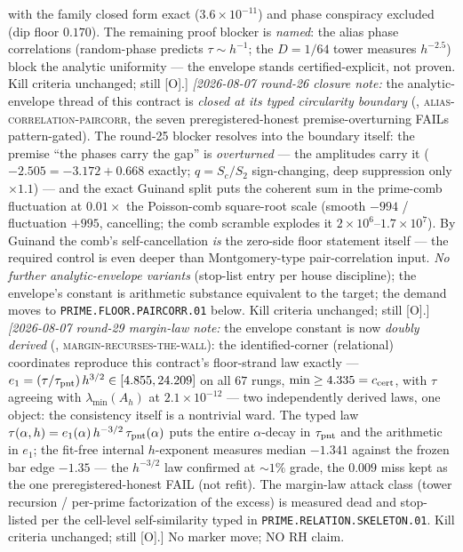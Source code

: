 {with the family closed form exact ($3.6\times10^{-11}$) and
phase conspiracy excluded (dip floor $0.170$).  The remaining
proof blocker is \emph{named}: the alias phase correlations
(random-phase predicts $\tau \sim h^{-1}$; the $D = 1/64$ tower
measures $h^{-2.5}$) block the analytic uniformity --- the
envelope stands certified-explicit, not proven.  Kill criteria
unchanged; still [O].]
\emph{[2026-08-07 round-26 closure note:} the analytic-envelope
thread of this contract is \emph{closed at its typed circularity
boundary} (,
\textsc{alias-correlation-paircorr}, the seven
preregistered-honest premise-overturning FAILs pattern-gated).
The round-25 blocker resolves into the boundary itself: the
premise ``the phases carry the gap'' is \emph{overturned} --- the
amplitudes carry it ($-2.505 = -3.172 + 0.668$ exactly;
$q = S_c/S_2$ sign-changing, deep suppression only $\times1.1$)
--- and the exact Guinand split puts the coherent sum in the
prime-comb fluctuation at $0.01\times$ the Poisson-comb
square-root scale (smooth $-994$ / fluctuation $+995$,
cancelling; the comb scramble explodes it
$2\times10^6$--$1.7\times10^7$).  By Guinand the comb's
self-cancellation \emph{is} the zero-side floor statement itself
--- the required control is even deeper than Montgomery-type
pair-correlation input.  \emph{No further analytic-envelope
variants} (stop-list entry per house discipline); the envelope's
constant is arithmetic substance equivalent to the target; the
demand moves to \texttt{PRIME.FLOOR.PAIRCORR.01} below.  Kill
criteria unchanged; still [O].]
\emph{[2026-08-07 round-29 margin-law note:} the envelope
constant is now \emph{doubly derived}
(,
\textsc{margin-recurses-the-wall}): the identified-corner
(relational) coordinates reproduce this contract's floor-strand
law exactly --- $e_1 = (\tau/\tau_{\rm pnt})\,h^{3/2} \in
[4.855, 24.209]$ on all $67$ rungs, $\min \ge 4.335 =
c_{\rm cert}$, with $\tau$ agreeing with $\lambda_{\min}(A_h)$
at $2.1\times10^{-12}$ --- two independently derived laws, one
object: the consistency itself is a nontrivial ward.  The typed
law $\tau(\alpha, h) = e_1(\alpha)\, h^{-3/2}\,
\tau_{\rm pnt}(\alpha)$ puts the entire $\alpha$-decay in
$\tau_{\rm pnt}$ and the arithmetic in $e_1$; the fit-free
internal $h$-exponent measures median $-1.341$ against the
frozen bar edge $-1.35$ --- the $h^{-3/2}$ law confirmed at
$\sim1\%$ grade, the $0.009$ miss kept as the one
preregistered-honest FAIL (not refit).  The margin-law attack
class (tower recursion / per-prime factorization of the excess)
is measured dead and stop-listed per the cell-level
self-similarity typed in \texttt{PRIME.RELATION.SKELETON.01}.
Kill criteria unchanged; still [O].]
No marker move; NO RH claim.\par}


